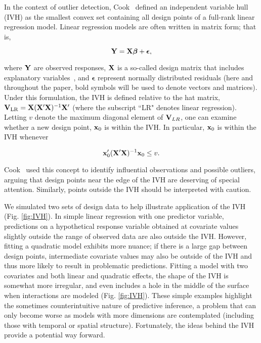 \documentclass[10pt,letterpaper]{article}
\begin{document}
In the context of outlier detection, Cook~\cite{Cook1979} defined an independent variable hull (IVH) as the smallest convex set containing all design points of a full-rank linear regression model.  Linear regression models are often written in matrix form; that is,
\begin{linenomath*}
\begin{equation*}
  {\bf Y} = {\bf X} \boldsymbol{\beta} + \boldsymbol{\epsilon},
\end{equation*}
\end{linenomath*}
where ${\bf Y}$ are observed responses, ${\bf X}$ is a so-called design matrix that includes explanatory variables~\cite{Draper1966}, and $\boldsymbol{\epsilon}$ represent normally distributed residuals (here and throughout the paper, bold symbols will be used to denote vectors and matrices).
Under this formulation, the IVH is defined relative to the hat matrix, ${\bf V}_{\rm LR}={\bf X}({\bf X}^\prime{\bf X})^{-1}{\bf X}^\prime$ (where the subscript ``LR" denotes linear regression).  Letting $v$ denote the maximum diagonal element of ${\bf V}_{LR}$, one can examine whether a new design point, ${\bf x}_0$ is within the IVH.  In particular, ${\bf x}_0$ is within the IVH whenever
\begin{linenomath*}
\begin{equation}
  \label{eq:IVH}
  {\bf x}_0^\prime ({\bf X}^\prime{\bf X})^{-1}{\bf x}_0 \le v.
\end{equation}
\end{linenomath*}
Cook~\cite{Cook1979} used this concept to identify influential observations and possible outliers, arguing that design points near the edge of the IVH are deserving of special attention.  Similarly, points outside the IVH should be interpreted with caution.

We simulated two sets of design data to help illustrate application of the IVH (Fig. \ref{fig:IVH}).  In simple linear regression with one predictor variable, predictions on a hypothetical response variable obtained at covariate values slightly outside the range of observed data are also outside the IVH.  However, fitting a quadratic model exhibits more nuance; if there is a large gap between design points, intermediate covariate values may also be outside of the IVH and thus more likely to result in problematic predictions.  Fitting a model with two covariates and both linear and quadratic effects, the shape of the IVH is somewhat more irregular, and even includes a hole in the middle of the surface when interactions are modeled (Fig. \ref{fig:IVH}).  These simple examples highlight the sometimes counterintuitive nature of predictive inference, a problem that can only become worse as models with more dimensions are contemplated (including those with temporal or spatial structure).  Fortunately, the ideas behind the IVH provide a potential way forward.
\end{document}
